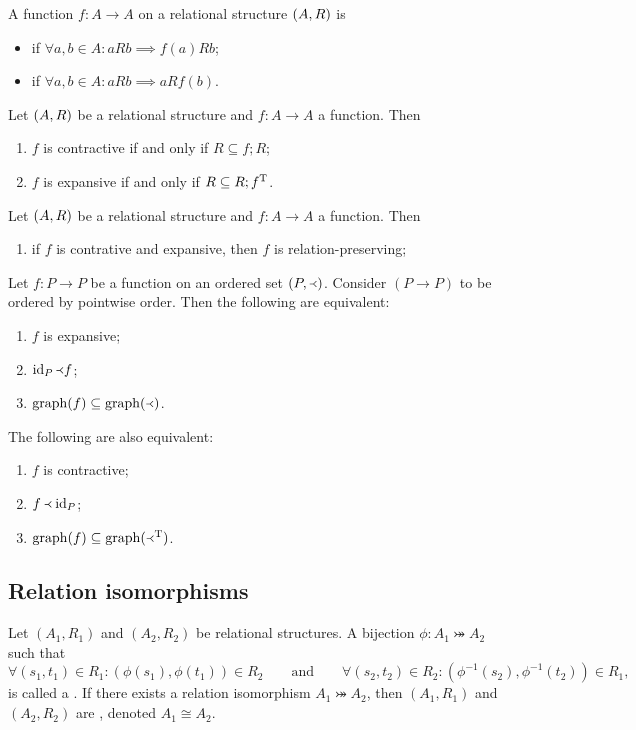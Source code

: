 \begin{definition}
A function $f: A\to A$ on a relational structure $\left( A, R \right)$ is
\begin{itemize}
\item {} if $\forall a,b\in A: aRb \implies f(a)Rb$;
\item {} if $\forall a,b\in A: aRb \implies aRf(b)$.
\end{itemize}
\end{definition}

\begin{lemma}
Let $\left( A, R \right)$ be a relational structure and $f:A\to A$ a function. Then
\begin{enumerate}
\item $f$ is contractive \textup{if and only if} $R \subseteq f;R$;
\item $f$ is expansive \textup{if and only if} $R \subseteq R;f^{\mathrm{T}}$.
\end{enumerate}
\end{lemma}

\begin{lemma}
Let $\left( A, R \right)$ be a relational structure and $f:A\to A$ a function. Then
\begin{enumerate}
\item if $f$ is contrative and expansive, then $f$ is relation-preserving;
\end{enumerate}
\end{lemma}

\begin{lemma}
Let $f:P\to P$ be a function on an ordered set $(P,\Yleft)$. Consider $(P\to P)$ to be ordered by pointwise order. Then the following are equivalent:
\begin{enumerate}
\item $f$ is expansive;
\item $\operatorname{id}_P \Yleft f$;
\item $\operatorname{graph}(f) \subseteq \operatorname{graph}(\Yleft)$.
\end{enumerate}
The following are also equivalent:
\begin{enumerate}
\item $f$ is contractive;
\item $f \Yleft \operatorname{id}_P$;
\item $\operatorname{graph}(f) \subseteq \operatorname{graph}(\Yleft^{\mathrm{T}})$.
\end{enumerate}
\end{lemma}


\subsection{Relation isomorphisms}
\begin{definition}
Let $(A_1, R_1)$ and $(A_2, R_2)$ be relational structures. A bijection $\phi:A_1 \twoheadrightarrowtail A_2$ such that
\[ \forall (s_1,t_1)\in R_1: (\phi(s_1),\phi(t_1))\in R_2 \qquad \text{and} \qquad \forall (s_2,t_2)\in R_2: (\phi^{-1}(s_2),\phi^{-1}(t_2))\in R_1, \]
is called a . If there exists a relation isomorphism $A_1 \twoheadrightarrowtail A_2$, then $(A_1, R_1)$ and $(A_2, R_2)$ are , denoted $A_1 \cong A_2$.
\end{definition}

